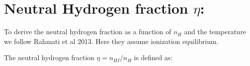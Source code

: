 \documentclass[12pt]{article}
\begin{document}








\section{Neutral Hydrogen fraction $\eta$:}\label{sec:eta}

To derive the neutral hydrogen fraction as a function of $n_H$ and the
temperature we follow Rahmati et al 2013. Here they assume ionization equilibrium.

The neutral hydrogen fraction $\eta = n_{HI} / n_H$
is defined as:\\
\end{document}
